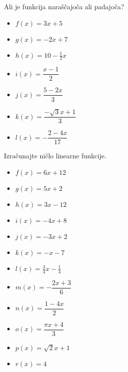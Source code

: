         


        
            \begin{naloga}
                Ali je funkcija naraščajoča ali padajoča?
                \begin{multicols}{2}
                    \begin{itemize}
                        \item $f(x)=3x+5$ 
                        \item $g(x)=-2x+7$ 
                        \item $h(x)=10-\frac{1}{2}x$ 
                        \item $i(x)=\dfrac{x-1}{2}$ 
                        \item $j(x)=\dfrac{5-2x}{3}$ 
                        \item $k(x)=\dfrac{-\sqrt{3}x+1}{3}$ 
                        \item $l(x)=-\dfrac{2-4x}{17}$ 
                    \end{itemize}
                \end{multicols}
            \end{naloga}
        


        
            \begin{naloga}
                Izračunajte ničlo linearne funkcije.
                \begin{multicols}{2}
                    \begin{itemize}
                        \item $f(x)=6x+12$ 
                        \item $g(x)=5x+2$ 
                        \item $h(x)=3x-12$ 
                        \item $i(x)=-4x+8$ 
                        \item $j(x)=-3x+2$ 
                        \item $k(x)=-x-7$ 
                        \item $l(x)=\frac{3}{4}x-\frac{1}{4}$ 
                        \item $m(x)=-\dfrac{2x+3}{6}$ 
                        \item $n(x)=\dfrac{1-4x}{2}$ 
                        \item $o(x)=\dfrac{\pi x+4}{3}$ 
                        \item $p(x)=\sqrt{2}x+1$ 
                        \item $r(x)=4$ 
                    \end{itemize}
                \end{multicols}
            \end{naloga}
        


